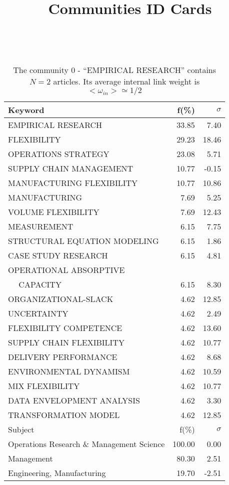 \documentclass[a4paper,11pt]{report}
\title{{\bf Communities ID Cards}}
\date{\begin{flushleft}This document gather the ``ID Cards'' of the CC communities found within your database.\\
 The CC network was built by keeping a link between articles sharing at least 10 references. The communities characterized here correspond to the ones found in the level 0 (in the sense of the Louvain algo) which gathers more than 0 articles.\\
 These ID cards displays the most frequent keywords, subject categories, journals of publication, institution, countries, authors, references and reference journals of the articles of each community. The significance of an item $\sigma = \sqrt{N} (f - p) / \sqrt{p(1-p)}$ [where $N$ is the number of articles within the community and $f$ and $p$ are the proportion of articles respectively within the community and within the database displaying that item ] is also given (for example $\sigma > 5$ is really highly significant).\\
\vspace{1cm}
\copyright Sebastian Grauwin, Liu Weizhi - (2014) \end{flushleft}}
\begin{document}
\begin{landscape}
\maketitle
\clearpage

\begin{table}[!ht]
\caption{The community 0 - ``EMPIRICAL RESEARCH'' contains $N = 2$ articles. Its average internal link weight is $<\omega_{in}> \simeq 1/2$ }
\textcolor{white}{aa}\\
{\scriptsize\begin{tabular}{|l r r|}
\hline
Keyword & f(\%) & $\sigma$\\
\hline
EMPIRICAL RESEARCH & 33.85 & 7.40\\
FLEXIBILITY & 29.23 & 18.46\\
OPERATIONS STRATEGY & 23.08 & 5.71\\
SUPPLY CHAIN MANAGEMENT & 10.77 & -0.15\\
MANUFACTURING FLEXIBILITY & 10.77 & 10.86\\
MANUFACTURING & 7.69 & 5.25\\
VOLUME FLEXIBILITY & 7.69 & 12.43\\
MEASUREMENT & 6.15 & 7.75\\
STRUCTURAL EQUATION MODELING & 6.15 & 1.86\\
CASE STUDY RESEARCH & 6.15 & 4.81\\
OPERATIONAL ABSORPTIVE &  & \\
$\quad$ CAPACITY & 6.15 & 8.30\\
ORGANIZATIONAL-SLACK & 4.62 & 12.85\\
UNCERTAINTY & 4.62 & 2.49\\
FLEXIBILITY COMPETENCE & 4.62 & 13.60\\
SUPPLY CHAIN FLEXIBILITY & 4.62 & 10.77\\
DELIVERY PERFORMANCE & 4.62 & 8.68\\
ENVIRONMENTAL DYNAMISM & 4.62 & 10.59\\
MIX FLEXIBILITY & 4.62 & 10.77\\
DATA ENVELOPMENT ANALYSIS & 4.62 & 3.30\\
TRANSFORMATION MODEL & 4.62 & 12.85\\
\hline
\hline
Subject & f(\%) & $\sigma$\\
\hline
Operations Research \& Management Science & 100.00 & 0.00\\
Management & 80.30 & 2.51\\
Engineering, Manufacturing & 19.70 & -2.51\\

\end{tabular}}
\end{table}
\end{landscape}
\end{document}
